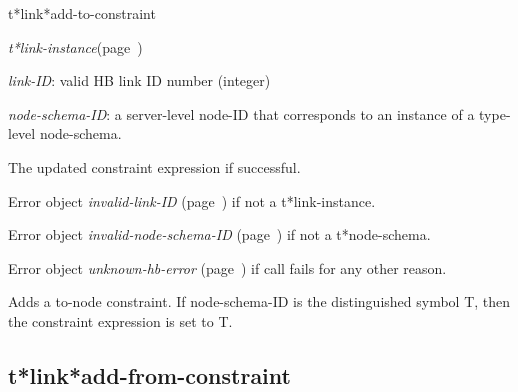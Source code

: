 \begin{description}
\item [Name:]  t*link*add-to-constraint

\item [Class:] {\sl t*link-instance}\hfill(page~\pageref{t*link-instance})

\item [Parameters:]
\item {\sl link-ID}:  
valid HB link ID number (integer)

\item {\sl node-schema-ID}:  a server-level node-ID that corresponds to an 
instance of a type-level node-schema. 



\item [Return-value:]
The updated constraint expression if successful.

Error object {\sl invalid-link-ID} (page~\pageref{invalid-link-ID}) if not a t*link-instance.

Error object {\sl invalid-node-schema-ID} (page~\pageref{invalid-node-schema-ID}) if not a
t*node-schema.

Error object {\sl unknown-hb-error} (page~\pageref{unknown-hb-error}) if call fails for
any other reason.

\item [Description:]

Adds a to-node constraint. If node-schema-ID is the
distinguished symbol T, then the constraint expression
is set to T.

\item [Public:]



\end{description}
\horizontalline

\subsection{t*link*add-from-constraint}
\label{t*link*add-from-constraint}

